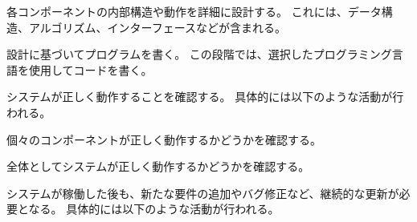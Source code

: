各コンポーネントの内部構造や動作を詳細に設計する。
これには、データ構造、アルゴリズム、インターフェースなどが含まれる。




設計に基づいてプログラムを書く。
この段階では、選択したプログラミング言語を使用してコードを書く。




システムが正しく動作することを確認する。
具体的には以下のような活動が行われる。



個々のコンポーネントが正しく動作するかどうかを確認する。



全体としてシステムが正しく動作するかどうかを確認する。




システムが稼働した後も、新たな要件の追加やバグ修正など、継続的な更新が必要となる。
具体的には以下のような活動が行われる。



